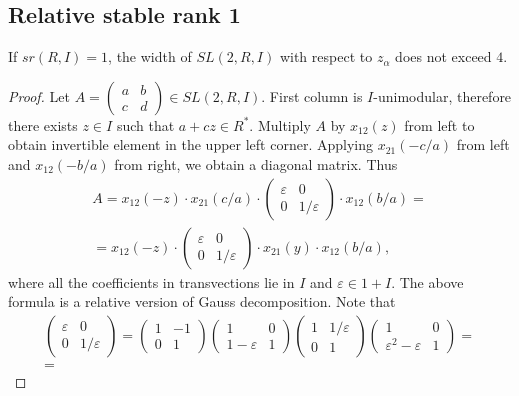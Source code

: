 
\subsection{Relative stable rank 1}
\begin{lemma}\label{lemma:srRI1}
If $sr(R,I)=1$, the width of $SL(2,R,I)$ with respect to $z_\alpha$ does not exceed $4$.
\end{lemma}
\begin{proof}

Let $A=\begin{pmatrix}a & b \\ c & d\end{pmatrix}\in SL(2,R,I)$. First column is $I$-unimodular, therefore there exists $z\in I$ such that $a+cz\in R^*$. Multiply $A$ by $x_{12}(z)$ from left to obtain invertible element in the upper left corner. Applying $x_{21}(-c/a)$ from left and $x_{12}(-b/a)$ from right, we obtain a diagonal matrix. Thus
\begin{multline*}
A=x_{12}(-z)\cdot x_{21}(c/a)\cdot
\begin{pmatrix} \varepsilon & 0 \\ 0 & 1/\varepsilon \end{pmatrix}
\cdot x_{12}(b/a)=\\
=x_{12}(-z)\cdot
\begin{pmatrix} \varepsilon & 0 \\ 0 & 1/\varepsilon \end{pmatrix}
\cdot x_{21}(y) \cdot x_{12}(b/a),
\end{multline*}
where all the coefficients in transvections lie in $I$ and $\varepsilon\in 1+I$. The above formula is a relative version of Gauss decomposition.
Note that
\begin{multline*}
\begin{pmatrix} \varepsilon & 0 \\ 0 & 1/\varepsilon \end{pmatrix} =
\begin{pmatrix} 1 & -1 \\ 0 & 1 \end{pmatrix}
\begin{pmatrix} 1 & 0 \\ 1-\varepsilon & 1 \end{pmatrix}
\begin{pmatrix} 1 & 1/\varepsilon \\ 0 & 1 \end{pmatrix}
\begin{pmatrix} 1 & 0 \\ \varepsilon^2-\varepsilon & 1 \end{pmatrix} =\\=

\end{multline*}
\end{proof}
